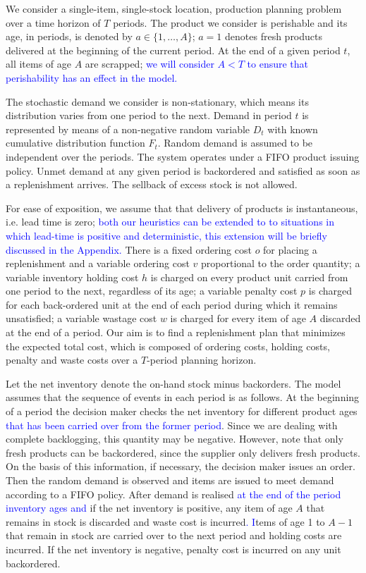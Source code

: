 \documentclass{tPRS2e}
\newcommand{\blue}{\textcolor{blue}}
\begin{document}
	We consider a single-item, single-stock location, production planning problem over a time horizon of $T$ periods. The product we consider is perishable and its age, in periods, is denoted by $a\in \{1,\ldots,A\}$; $a=1$ denotes fresh products delivered at the beginning of the current period. At the end of a given period $t$, all items of age $A$ are scrapped; \blue{we will consider $A<T$ to ensure that perishability has an effect in the model.}
	
	The stochastic demand we consider is non-stationary, which means its distribution varies from one period to the next. Demand in period $t$ is represented by means of a non-negative random variable $D_t$ with known cumulative distribution function $F_t$. Random demand is assumed to be independent over the periods. 	
	The system operates under a FIFO product issuing policy. Unmet demand at any given period is backordered and satisfied as soon as a replenishment arrives. The sellback of excess stock is not allowed.
	
For ease of exposition, we assume that that delivery of products is instantaneous, i.e. lead time is zero; \blue{
both our heuristics can be extended to to situations in which lead-time is positive and deterministic, this extension will be briefly discussed in the Appendix.}
There is a fixed ordering cost $o$ for placing a replenishment and a variable ordering cost $v$ proportional to the order quantity; a variable inventory holding cost $h$ is charged on every product unit carried from one period to the next, regardless of its age; a variable penalty cost $p$ is charged for each back-ordered unit at the end of each period during which it remains unsatisfied; a variable wastage cost $w$ is charged for every item of age $A$ discarded at the end of a period.
Our aim is to find a replenishment plan that minimizes the expected total cost, which is composed of ordering costs, holding costs, penalty and waste costs over a $T$-period planning horizon.
	
	Let the net inventory denote the on-hand stock minus backorders. The model assumes that the sequence of events in each period is as follows. At the beginning of a period the decision maker checks the net inventory for different product ages \blue{that has been carried over from the former period}. Since we are dealing with complete backlogging, this quantity may be negative. However, note that only fresh products can be backordered, since the supplier only delivers fresh products. On the basis of this information, if necessary, the decision maker issues an order. Then the random demand is observed and items are issued to meet demand according to a FIFO policy. After demand is realised \blue{at the end of the period inventory ages and} if the net inventory is positive, any item of age $A$ that remains in stock is discarded and waste cost is incurred\blue{. I}tems of age 1 to $A-1$ that remain in stock are carried over to the next period and holding costs are incurred. If the net inventory is negative, penalty cost is incurred on any unit backordered.
\end{document}
